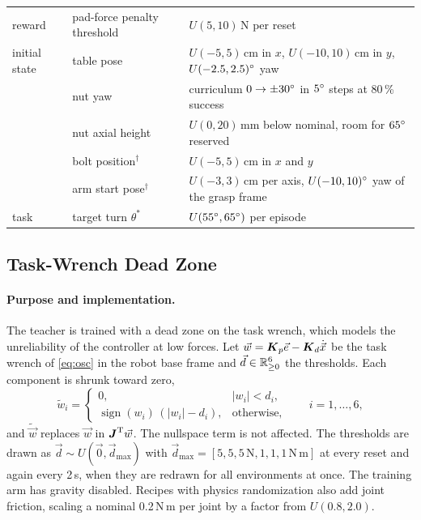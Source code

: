 \begin{table}[!htbp]
\begin{tabularx}{\textwidth}{lYY}
        reward & pad-force penalty threshold & $U(5,10)$\,N per reset \\
        initial state & table pose & $U(-5,5)$\,cm in $x$, $U(-10,10)$\,cm in $y$, $U(-2.5,2.5)^\circ$ yaw \\
         & nut yaw & curriculum $0\rightarrow\pm30^\circ$ in $5^\circ$ steps at 80\,\% success \\
         & nut axial height & $U(0,20)$\,mm below nominal, room for $65^\circ$ reserved \\
         & bolt position$^{\dagger}$ & $U(-5,5)$\,cm in $x$ and $y$ \\
         & arm start pose$^{\dagger}$ & $U(-3,3)$\,cm per axis, $U(-10,10)^\circ$ yaw of the grasp frame \\
        task & target turn $\theta^{*}$ & $U(55^\circ,65^\circ)$ per episode \\
        \bottomrule
    \end{tabularx}
\end{table}%

\subsection{Task-Wrench Dead Zone}\label{sec:app-ctrl-dz-train}

\paragraph{Purpose and implementation.} The teacher is trained with a dead zone on the task wrench, which models the unreliability of the controller at low forces. Let $\vec{w}=\boldsymbol{K}_p\vec{e}-\boldsymbol{K}_d\dot{\vec{x}}$ be the task wrench of \eqref{eq:osc} in the robot base frame and $\vec{d}\in\mathbb{R}^6_{\ge0}$ the thresholds. Each component is shrunk toward zero,
\begin{equation}\label{eq:dead-zone}
  \tilde{w}_i=\begin{cases}0, & |w_i|<d_i,\\ \operatorname{sign}(w_i)\,(|w_i|-d_i), & \text{otherwise,}\end{cases}\qquad i=1,\dots,6,
\end{equation}
and $\tilde{\vec{w}}$ replaces $\vec{w}$ in $\boldsymbol{J}^{\mathrm{T}}\vec{w}$. The nullspace term is not affected. The thresholds are drawn as $\vec{d}\sim U(\vec{0},\vec{d}_{\max})$ with $\vec{d}_{\max}=[5,5,5\,\mathrm{N},1,1,1\,\mathrm{N\,m}]$ at every reset and again every 2\,s, when they are redrawn for all environments at once. The training arm has gravity disabled. Recipes with physics randomization also add joint friction, scaling a nominal 0.2\,N\,m per joint by a factor from $U(0.8,2.0)$.

